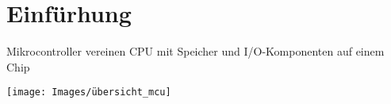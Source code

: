 \section{Einfürhung}
Mikrocontroller vereinen CPU mit Speicher und I/O-Komponenten auf einem Chip
\begin{center}
	\texttt{[image: Images/übersicht\_mcu]}
\end{center}

